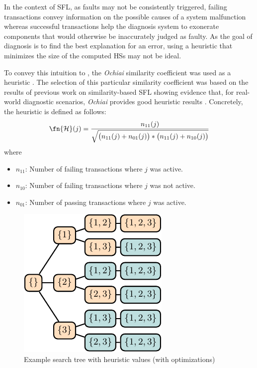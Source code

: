 In the context of \ac{SFL}, as faults may not be consistently
triggered, failing transactions convey information on the possible
causes of a system malfunction whereas successful transactions help
the diagnosis system to exonerate components that would otherwise be
inaccurately judged as faulty.
%
As the goal of diagnosis is to find the best explanation for an error,
using a heuristic that minimizes the size of the computed \acp{HS}
may not be ideal.

To convey this intuition to \staccato{}, the \textit{Ochiai}
similarity coefficient \citep{Meyer04} was used as a heuristic
\citep{Abreu09b}.
%
The selection of this particular similarity coefficient was based on
the results of previous work on similarity-based \ac{SFL} showing
evidence that, for real-world diagnostic scenarios, \textit{Ochiai}
provides good heuristic results \citep{Abreu07}.
%
Concretely, the heuristic is defined as follows:
\begin{equation}
  \fn{\mathcal H}(j) = \frac{n_{11}(j)}{\sqrt{\big(n_{11}(j)+n_{01}(j)\big)*\big(n_{11}(j)+n_{10}(j)\big)}}
\end{equation}
where
\begin{itemize}
\item $n_{11}$: Number of failing transactions where $j$ was active.
\item $n_{10}$: Number of failing transactions where $j$ was not
  active.
\item $n_{01}$: Number of passing transactions where $j$ was active.
\end{itemize}

\begin{figure}[!ht]
  \includegraphics[page=7]{figures/mhs2/figures/opts/main}
  \caption{Example search tree with heuristic values (with
    optimizations)}
  \label{fig:mhs2o:heuristic:search-tree}
\end{figure}


